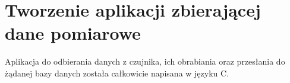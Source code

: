 \chapter{Tworzenie aplikacji zbierającej dane pomiarowe}

Aplikacja do odbierania danych z czujnika, ich obrabiania oraz przesłania do żądanej bazy danych została całkowicie napisana w języku C.